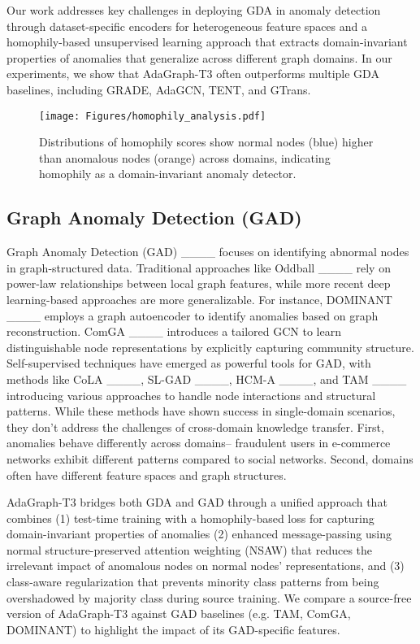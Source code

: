 Our work addresses key challenges in deploying GDA in anomaly detection through dataset-specific encoders for heterogeneous feature spaces and a homophily-based unsupervised learning approach that extracts domain-invariant properties of anomalies that generalize across different graph domains. In our experiments, we show that AdaGraph-T3 often outperforms multiple GDA baselines, including GRADE, AdaGCN, TENT, and GTrans.


\begin{figure}[t]
   \centering
   \texttt{[image: Figures/homophily\_analysis.pdf]}
   \caption{Distributions of homophily scores show normal nodes (blue) higher than anomalous nodes (orange) across domains, indicating homophily as a domain-invariant anomaly detector.}
   \label{fig:homophily}
\end{figure}
\subsection{Graph Anomaly Detection (GAD)}
Graph Anomaly Detection (GAD) ____ focuses on identifying abnormal nodes in graph-structured data. Traditional approaches like Oddball ____ rely on power-law relationships between local graph features, while more recent deep learning-based approaches are more generalizable. For instance, DOMINANT ____ employs a graph autoencoder to identify anomalies based on graph reconstruction. ComGA ____ introduces a tailored GCN to learn distinguishable node representations by explicitly capturing community structure. Self-supervised techniques have emerged as powerful tools for GAD, with methods like CoLA ____, SL-GAD ____, HCM-A ____, and TAM ____ introducing various approaches to handle node interactions and structural patterns. While these methods have shown success in single-domain scenarios, they don't address the challenges of cross-domain knowledge transfer. First,
anomalies behave differently across domains-- fraudulent users in e-commerce networks exhibit different patterns compared to social networks. Second, domains often have different feature spaces and graph structures.


AdaGraph-T3 bridges both GDA and GAD through a unified approach that combines (1) test-time training with a homophily-based loss for capturing domain-invariant properties of anomalies
(2) enhanced message-passing using normal structure-preserved attention weighting (NSAW) that reduces the irrelevant impact of anomalous nodes on normal nodes' representations, and (3) class-aware regularization that prevents minority class patterns from being overshadowed by majority class during source training. We compare a source-free version of AdaGraph-T3 against GAD baselines (e.g. TAM, ComGA, DOMINANT) to highlight the impact of its GAD-specific features.
